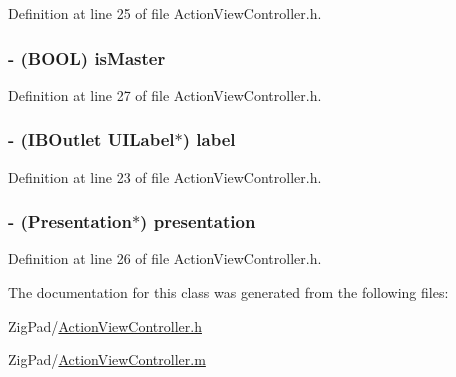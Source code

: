 Definition at line 25 of file ActionViewController.h.

\hypertarget{interface_action_view_controller_abbe31ad947ac06e484e486dd2d47c541}{
\subsubsection[{isMaster}]{\setlength{\rightskip}{0pt plus 5cm}-\/ (BOOL) isMaster}}
\label{interface_action_view_controller_abbe31ad947ac06e484e486dd2d47c541}


Definition at line 27 of file ActionViewController.h.

\hypertarget{interface_action_view_controller_a729dc1b9adc6098142f097c005a990ba}{
\subsubsection[{label}]{\setlength{\rightskip}{0pt plus 5cm}-\/ (IBOutlet UILabel$\ast$) label}}
\label{interface_action_view_controller_a729dc1b9adc6098142f097c005a990ba}


Definition at line 23 of file ActionViewController.h.

\hypertarget{interface_action_view_controller_a4687fd0668ba32c76160e4d4f1747c12}{
\subsubsection[{presentation}]{\setlength{\rightskip}{0pt plus 5cm}-\/ ({\bf Presentation}$\ast$) presentation}}
\label{interface_action_view_controller_a4687fd0668ba32c76160e4d4f1747c12}


Definition at line 26 of file ActionViewController.h.



The documentation for this class was generated from the following files:\begin{DoxyCompactItemize}
\item 
ZigPad/\hyperlink{_action_view_controller_8h}{ActionViewController.h}\item 
ZigPad/\hyperlink{_action_view_controller_8m}{ActionViewController.m}\end{DoxyCompactItemize}
